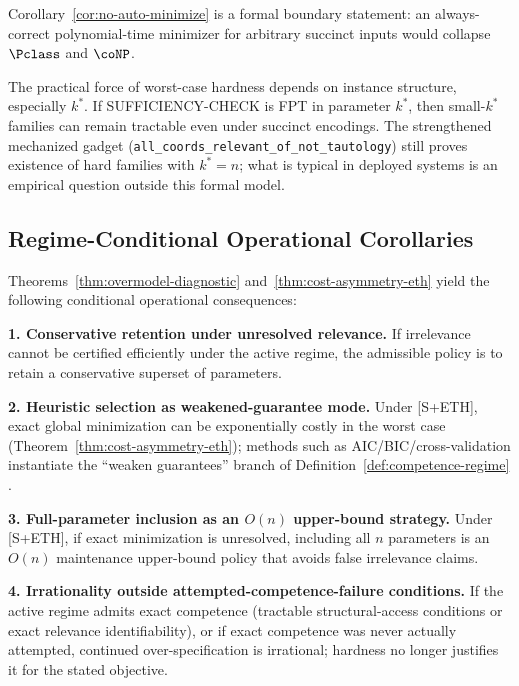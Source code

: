 \begin{remark}
Corollary~\ref{cor:no-auto-minimize} is a formal boundary statement: an always-correct polynomial-time minimizer for arbitrary succinct inputs would collapse \(\Pclass\) and \(\coNP\).
\end{remark}

\begin{remark}
The practical force of worst-case hardness depends on instance structure, especially $k^*$. If SUFFICIENCY-CHECK is FPT in parameter $k^*$, then small-$k^*$ families can remain tractable even under succinct encodings. The strengthened mechanized gadget (\texttt{all\_coords\_relevant\_of\_not\_tautology}) still proves existence of hard families with $k^*=n$; what is typical in deployed systems is an empirical question outside this formal model.
\end{remark}

\subsection{Regime-Conditional Operational Corollaries}

Theorems~\ref{thm:overmodel-diagnostic} and~\ref{thm:cost-asymmetry-eth} yield the following conditional operational consequences:

\textbf{1. Conservative retention under unresolved relevance.} If irrelevance cannot be certified efficiently under the active regime, the admissible policy is to retain a conservative superset of parameters.

\textbf{2. Heuristic selection as weakened-guarantee mode.} Under [S+ETH], exact global minimization can be exponentially costly in the worst case (Theorem~\ref{thm:cost-asymmetry-eth}); methods such as AIC/BIC/cross-validation instantiate the ``weaken guarantees'' branch of Definition~\ref{def:competence-regime} \cite{akaike1974new, schwarz1978estimating, stone1974cross, guyon2003introduction, pearl2009causality}.

\textbf{3. Full-parameter inclusion as an \(O(n)\) upper-bound strategy.} Under [S+ETH], if exact minimization is unresolved, including all \(n\) parameters is an \(O(n)\) maintenance upper-bound policy that avoids false irrelevance claims.

\textbf{4. Irrationality outside attempted-competence-failure conditions.} If the active regime admits exact competence (tractable structural-access conditions or exact relevance identifiability), or if exact competence was never actually attempted, continued over-specification is irrational; hardness no longer justifies it for the stated objective.

